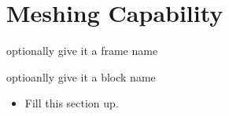 \section{Meshing Capability}
\begin{frame}{optionally give it a frame name}
	\begin{block}{optioanlly give it a block name}
		\begin{itemize}
			\item Fill this section up.
		\end{itemize}
	\end{block}
\end{frame}

